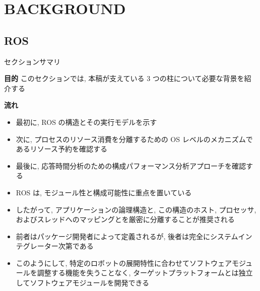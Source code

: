 
\section{BACKGROUND}
\label{sec: background}

\subsection{ROS}
\label{ssec: ros}

\begin{frame}{セクションサマリ}
    \begin{itembox}[l]{\textbf{目的}}
        このセクションでは, 本稿が支えている 3 つの柱について必要な背景を紹介する
    \end{itembox}
    \begin{itembox}[l]{\textbf{流れ}}
        \begin{itemize}
            \item 最初に, ROS の構造とその実行モデルを示す
            \item 次に, プロセスのリソース消費を分離するための OS レベルのメカニズムであるリソース予約を確認する
            \item 最後に, 応答時間分析のための構成パフォーマンス分析アプローチを確認する
        \end{itemize}
    \end{itembox}
\end{frame}

\begin{frame}{}
    \begin{itemize}
        \item ROS は, モジュール性と構成可能性に重点を置いている
        \item したがって, アプリケーションの論理構造と, この構造のホスト, プロセッサ, およびスレッドへのマッピングとを厳密に分離することが推奨される
        \item 前者はパッケージ開発者によって定義されるが, 後者は完全にシステムインテグレーター次第である
        \item このようにして, 特定のロボットの展開特性に合わせてソフトウェアモジュールを調整する機能を失うことなく, ターゲットプラットフォームとは独立してソフトウェアモジュールを開発できる
    \end{itemize}
\end{frame}

